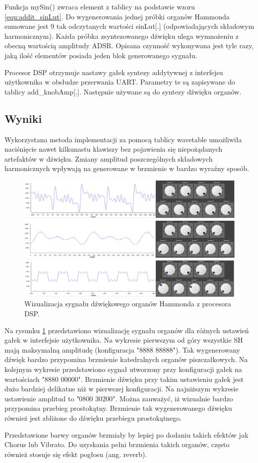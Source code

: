 Funkcja mySin() zwraca element z tablicy na podstawie wzoru \ref{equ:addit_sinLut}. Do wygenerowania jednej próbki organów Hammonda sumowane jest 9 tak odczytanych wartości sinLut[.] (odpowiadających składowym harmonicznym). Każda próbka zsyntezowanego dźwięku ulega wymnożeniu z obecną wartością amplitudy ADSR. Opisana czynność wykonywana jest tyle razy, jaką ilość elementów posiada jeden blok generowanego sygnału.

Procesor DSP otrzymuje nastawy gałek syntezy addytywnej z interfejsu użytkownika w obsłudze przerwania UART. Parametry te są zapisywane do tablicy add\_knobAmp[.]. Następnie używane są do syntezy dźwięku organów.

\subsection{Wyniki}
Wykorzystana metoda implementacji za pomocą tablicy wavetable umożliwiła naciśnięcie nawet kilkunastu klawiszy bez pojawienia się niepożądanych artefaktów w dźwięku. Zmiany amplitud poszczególnych składowych harmonicznych wpływają na generowane w brzmienie w bardzo wyraźny sposób.

\begin{figure}[H]
	\centering
	\includegraphics[width=15cm]{grafiki/add_hammond_dsp}
	\captionsetup{justification=centering}
	\caption{Wizualizacja sygnału dźwiękowego organów Hammonda z procesora DSP.}
	\label{rys:add_hammond_dsp}
\end{figure}

Na rysunku \ref{rys:add_hammond_dsp} przedstawiono wizualizację sygnału organów dla różnych ustawień gałek w interfejsie użytkownika. Na wykresie pierwszym od góry wszystkie SH mają maksymalną amplitudę (konfiguracja "8888 88888"). Tak wygenerowany dźwięk bardzo przypomina brzmienie katedralnych organów piszczałkowych. Na kolejnym wykresie przedstawiono sygnał utworzony przy konfiguracji gałek na wartościach "8880 00000". Brzmienie dźwięku przy takim ustawieniu gałek jest dużo bardziej delikatne niż w pierwszej konfiguracji. Na najniższym wykresie ustawienie amplitud to "0800 30200". Można zauważyć, iż wizualnie bardzo przypomina przebieg prostokątny. Brzmienie tak wygenerowanego dźwięku również jest zbliżone do dźwięku przebiegu prostokątnego.

Przedstawione barwy organów brzmiały by lepiej po dodaniu takich efektów jak Chorus lub Vibrato. Do uzyskania pełni brzmienia takich organów, często również stosuje się efekt pogłosu (ang. reverb).